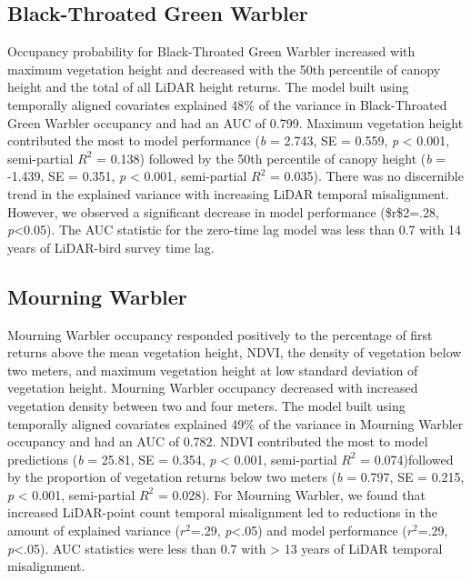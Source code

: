 \documentclass[
  12pt,
]{article}
\begin{document}
\hypertarget{black-throated-green-warbler}{%
\subsection{Black-Throated Green Warbler}\label{black-throated-green-warbler}}

Occupancy probability for Black-Throated Green Warbler increased with maximum vegetation height and decreased with the 50th percentile of canopy height and the total of all LiDAR height returns. The model built using temporally aligned covariates explained 48\% of the variance in Black-Throated Green Warbler occupancy and had an AUC of 0.799. Maximum vegetation height contributed the most to model performance (\emph{b} = 2.743, SE = 0.559, \emph{p} \textless{} 0.001, semi-partial \(R^2\) = 0.138) followed by the 50th percentile of canopy height (\emph{b} = -1.439, SE = 0.351, \emph{p} \textless{} 0.001, semi-partial \(R^2\) = 0.035). There was no discernible trend in the explained variance with increasing LiDAR temporal misalignment. However, we observed a significant decrease in model performance (\$r\$2=.28, \emph{p}\textless0.05). The AUC statistic for the zero-time lag model was less than 0.7 with 14 years of LiDAR-bird survey time lag.

\hypertarget{mourning-warbler}{%
\subsection{Mourning Warbler}\label{mourning-warbler}}

Mourning Warbler occupancy responded positively to the percentage of first returns above the mean vegetation height, NDVI, the density of vegetation below two meters, and maximum vegetation height at low standard deviation of vegetation height. Mourning Warbler occupancy decreased with increased vegetation density between two and four meters. The model built using temporally aligned covariates explained 49\% of the variance in Mourning Warbler occupancy and had an AUC of 0.782. NDVI contributed the most to model predictions (\emph{b} = 25.81, SE = 0.354, \emph{p} \textless{} 0.001, semi-partial \(R^2\) = 0.074)followed by the proportion of vegetation returns below two meters (\emph{b} = 0.797, SE = 0.215, \emph{p} \textless{} 0.001, semi-partial \(R^2\) = 0.028). For Mourning Warbler, we found that increased LiDAR-point count temporal misalignment led to reductions in the amount of explained variance (\(r^2\)=.29, \emph{p}\textless.05) and model performance (\(r^2\)=.29, \emph{p}\textless.05). AUC statistics were less than 0.7 with \textgreater{} 13 years of LiDAR temporal misalignment.
\end{document}

